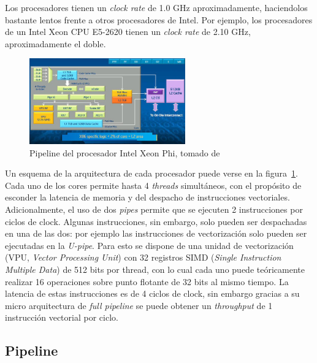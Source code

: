 Los procesadores tienen un \textit{clock rate} de 1.0 GHz aproximadamente, haciendolos bastante lentos frente
a otros procesadores de Intel. Por ejemplo, los procesadores de un Intel Xeon CPU E5-2620 tienen un \textit{clock rate}
de 2.10 GHz, aproximadamente el doble.

\begin{figure}[htbp]
   \centering
   \includegraphics[width=0.6\textwidth]{images/xeon-phi-core.jpg}
   \caption{Pipeline del procesador Intel Xeon Phi, tomado de~\cite{XeonPhiArchArticle} }
   \label{fig::xeon_phi_core}
\end{figure}

Un esquema de la arquitectura de cada procesador puede verse en la figura~\ref{fig::xeon_phi_core}. Cada uno de los cores
permite hasta 4 \textit{threads} simult\'aneos, con el prop\'osito de esconder la latencia de memoria y del despacho de
instrucciones vectoriales. Adicionalmente, el uso de dos \textit{pipes} permite que se ejecuten 2
instrucciones por ciclos de clock.  Algunas instrucciones, sin embargo, solo pueden ser despachadas en una de las dos:
por ejemplo las instrucciones de vectorizaci\'on solo pueden ser ejecutadas en la \textit{U-pipe}. Para esto se dispone
de una unidad de vectorizaci\'on (VPU, \textit{Vector Processing Unit}) con 32 registros SIMD (\textit{Single Instruction
Multiple Data}) de 512 bits por thread, con lo cual cada uno puede te\'oricamente realizar 16 operaciones sobre punto flotante de
32 bits al mismo tiempo. La latencia de estas instrucciones es de 4 ciclos de clock, sin embargo gracias a su micro
arquitectura de \textit{full pipeline} se puede obtener un \textit{throughput} de 1 instrucci\'on vectorial por ciclo.

\subsection{Pipeline}

